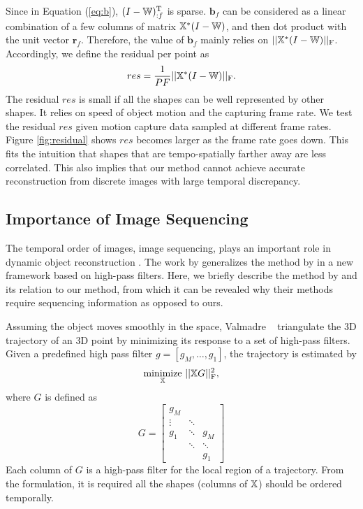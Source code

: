 Since in Equation (\ref{eq:b}), $(I-\mathbb W)_{:f}^\text{T}$ is sparse. $\mathbf{b}_f$ can be considered as a linear combination of a few columns of matrix $\mathbb X^*(I-\mathbb W)$, and then dot product with the unit vector $\mathbf{r}_f$.
Therefore, the value of $\mathbf{b}_f$ mainly relies on $||\mathbb X^*(I-\mathbb W)||_\text{F}$.
Accordingly, we define the residual per point as
\begin{equation}
res = \frac{1}{PF}||\mathbb X^*(I-\mathbb W)||_\text{F}. \label{eq:residual}
\end{equation}
The residual $res$ is small if all the shapes can be well represented by other shapes. It relies on speed of object motion and the capturing frame rate. 
We test the residual $res$ given motion capture data sampled at different frame rates. Figure \ref{fig:residual} shows $res$ becomes larger as the frame rate goes down. This fits the intuition that shapes that are tempo-spatially farther away are less correlated. This also implies that our method cannot achieve accurate reconstruction from discrete images with large temporal discrepancy. 


\subsection{Importance of Image Sequencing} \label{sec:importance_of_image_sequencing}
The temporal order of images, \ie image sequencing, plays an important role in dynamic object reconstruction \cite{Park_ECCV2010,zheng2014joint,Valmadre_CVPR2012}. The work by \cite{Valmadre_CVPR2012} generalizes the method by \cite{Park_ECCV2010} in a new framework based on high-pass filters. Here, we briefly describe the method by \citet{Valmadre_CVPR2012} and its relation to our method, from which it can be revealed why their methods require sequencing information as opposed to ours. 

Assuming the object moves smoothly in the space, Valmadre \etal~\cite{Valmadre_CVPR2012} triangulate the 3D trajectory of an 3D point by minimizing its response to a set of high-pass filters.
Given a predefined high pass filter $g=[g_M,\dots,g_1]$, the trajectory is estimated by 
\begin{equation}
\underset{\mathbb X}{\text{minimize}} ~ || \mathbb X G||_\text{F}^2,
\label{eq:valmadre_equ}
\end{equation}
where $G$ is defined as
\begin{equation}
G = \left[ 
\begin{matrix}
g_M  	&  		 &   	  	\\
\vdots	& \ddots &    	  	\\
g_1		& \ddots & g_M	  	\\
		& \ddots & \ddots 	\\
		&		 & g_1	
\end{matrix}
\right]
\label{eq:valmadre_filter_G}
\end{equation}
Each column of $G$ is a high-pass filter for the local region of a trajectory. From the formulation, it is required all the shapes (columns of $\mathbb X$) should be ordered temporally. 


